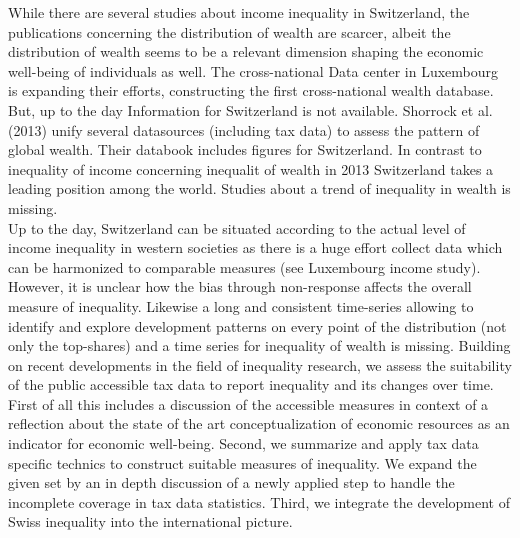 
While there are several studies about income inequality in Switzerland, the publications concerning the distribution of wealth are scarcer, albeit the distribution of wealth seems to be a relevant dimension shaping the economic well-being of individuals as well. The cross-national Data center in Luxembourg is expanding their efforts, constructing the first cross-national wealth database. But, up to the day Information for Switzerland is not available. Shorrock et al. (2013) unify several datasources (including tax data) to assess the pattern of global wealth. Their databook includes figures for Switzerland. In contrast to inequality of income concerning inequalit of wealth in 2013 Switzerland takes a leading position among the world. Studies about a trend of inequality in wealth is missing. \\


Up to the day, Switzerland can be situated according to the actual level of income inequality in western societies as there is a huge effort collect data which can be harmonized to comparable measures (see Luxembourg income study). However, it is unclear how the bias through non-response affects the overall measure of inequality. Likewise a long and consistent time-series allowing to identify and explore development patterns on every point of the distribution (not only the top-shares) and a time series for inequality of wealth is missing. Building on recent developments in the field of inequality research, we assess the suitability of the public accessible tax data to report inequality and its changes over time. First of all this includes a discussion of the accessible measures in context of a reflection about the state of the art conceptualization of economic resources as an indicator for economic well-being. Second, we summarize and apply tax data specific technics to construct suitable measures of inequality. We expand the given set by an in depth discussion of a newly applied step to handle the incomplete coverage in tax data statistics. Third, we integrate the development of Swiss inequality into the international picture.



